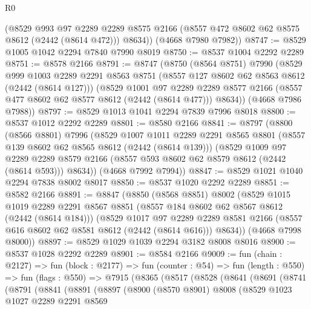 \begin{lexlean}{R0}
\begin{coremodule}
        (@8529
          @993
          @97
          @2289
          @2289
          @8575
          @2166
          (@8557 @472 @8602 @62 @8575 @8612 (@2442 (@8614 @472)))
          @8634))
      (@4668 @7980 @7982))
@8747 := @8529 @1005 @1042 @2294 @7840 @7990 @8019
@8750 := @8537 @1004 @2292 @2289
@8751 := @8578 @2166
@8791 := @8747
    (@8750
      (@8564 @8751)
      @7990
      (@8529
        @999
        @1003
        @2289
        @2291
        @8563
        @8751
        (@8557 @127 @8602 @62 @8563 @8612 (@2442 (@8614 @127)))
        (@8529
          @1001
          @97
          @2289
          @2289
          @8577
          @2166
          (@8557 @477 @8602 @62 @8577 @8612 (@2442 (@8614 @477)))
          @8634))
      (@4668 @7986 @7988))
@8797 := @8529 @1013 @1041 @2294 @7839 @7996 @8018
@8800 := @8537 @1012 @2292 @2289
@8801 := @8580 @2166
@8841 := @8797
    (@8800
      (@8566 @8801)
      @7996
      (@8529
        @1007
        @1011
        @2289
        @2291
        @8565
        @8801
        (@8557 @139 @8602 @62 @8565 @8612 (@2442 (@8614 @139)))
        (@8529
          @1009
          @97
          @2289
          @2289
          @8579
          @2166
          (@8557 @593 @8602 @62 @8579 @8612 (@2442 (@8614 @593)))
          @8634))
      (@4668 @7992 @7994))
@8847 := @8529 @1021 @1040 @2294 @7838 @8002 @8017
@8850 := @8537 @1020 @2292 @2289
@8851 := @8582 @2166
@8891 := @8847
    (@8850
      (@8568 @8851)
      @8002
      (@8529
        @1015
        @1019
        @2289
        @2291
        @8567
        @8851
        (@8557 @184 @8602 @62 @8567 @8612 (@2442 (@8614 @184)))
        (@8529
          @1017
          @97
          @2289
          @2289
          @8581
          @2166
          (@8557 @616 @8602 @62 @8581 @8612 (@2442 (@8614 @616)))
          @8634))
      (@4668 @7998 @8000))
@8897 := @8529 @1029 @1039 @2294 @3182 @8008 @8016
@8900 := @8537 @1028 @2292 @2289
@8901 := @8584 @2166
@9009 := fun (chain : @2127) =>
  fun (block : @2177) =>
  fun (counter : @54) =>
  fun (length : @550) =>
  fun (flags : @550) =>
  @7915
    (@8365
      (@8517
        (@8528
          (@8641
            (@8691
              (@8741
                (@8791
                  (@8841
                    (@8891
                      (@8897
                        (@8900
                          (@8570 @8901)
                          @8008
                          (@8529
                            @1023
                            @1027
                            @2289
                            @2291
                            @8569

\end{coremodule}
\end{lexlean}
